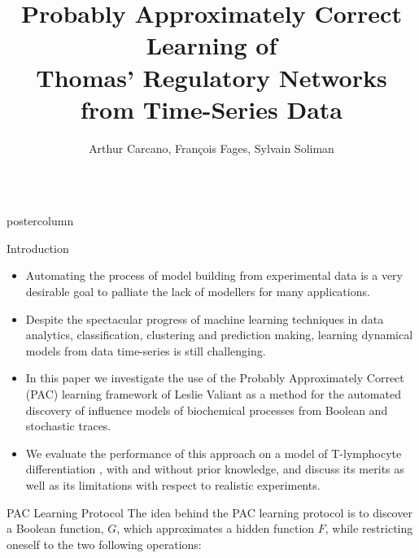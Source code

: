 \documentclass[final,hyperref={pdfpagelabels=false},xcolor=dvipsnames]{beamer}
\title{Probably Approximately Correct Learning of\\ Thomas' Regulatory Networks from Time-Series Data}
\author{Arthur Carcano, Fran\c{c}ois Fages, Sylvain Soliman}
\institute[Inria, Universit\'e Paris Saclay]{EP Lifeware, Inria, Universit\'e Paris Saclay, France}
\newlength{\columnheight}
\begin{document}
\begin{frame}[fragile]
  \begin{columns}
    \begin{column}{.49\textwidth}
      \begin{beamercolorbox}[center,wd=\textwidth]{postercolumn}
        \begin{minipage}[T]{.95\textwidth}  %
          \parbox[t][\columnheight]{\textwidth}{ %
            \begin{block}{Introduction}
              \begin{itemize}
              \item Automating the process of model building from experimental data 
is a very desirable goal to palliate the lack of modellers for many applications.
\item Despite the spectacular progress of machine learning techniques in data analytics, classification, clustering and prediction making,
learning dynamical models from data time-series is still challenging.
\item In this paper \cite{CFS17cmsb} we investigate the use of the Probably Approximately Correct (PAC) learning 
framework of Leslie Valiant \cite{Valiant84cacm} as a method for the automated discovery of influence models of biochemical processes from Boolean and stochastic traces. 
\item We evaluate the performance of this approach on a model of T-lymphocyte
differentiation \cite{RRMTC06tcsb,Mendoza06biosystems}, with and without prior knowledge,
and discuss its merits as well as its limitations with respect to realistic experiments.
              \end{itemize}              
            \end{block}
            \vfill
            \begin{block}{PAC Learning Protocol}
The idea behind the PAC learning protocol is to discover a Boolean
function, $G$, which approximates a hidden function $F$, while restricting oneself to the two following operations:
\begin{itemize}

\end{itemize}
\end{block}}
\end{minipage}
\end{beamercolorbox}
\end{column}
\end{columns}
\end{frame}
\end{document}
